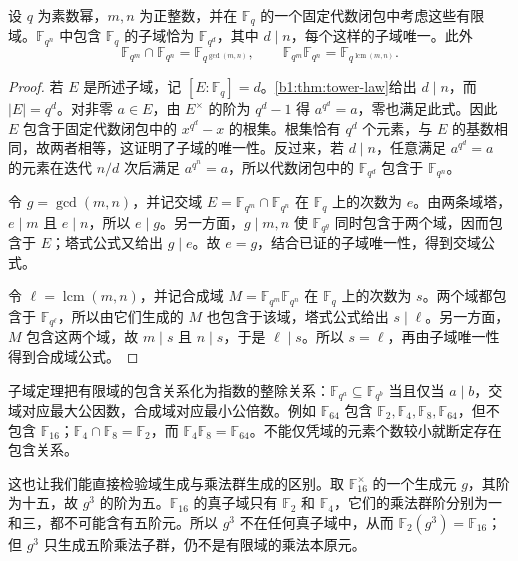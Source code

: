 \begin{theorem}\label{b1:thm:finite-field-subfields}
	设 \(q\) 为素数幂，\(m,n\) 为正整数，并在 \(\mathbb F_q\) 的一个固定代数闭包中考虑这些有限域。\(\mathbb F_{q^n}\) 中包含 \(\mathbb F_q\) 的子域恰为 \(\mathbb F_{q^d}\)，其中 \(d\mid n\)，每个这样的子域唯一。此外
	\[
		\mathbb F_{q^m}\cap\mathbb F_{q^n}=\mathbb F_{q^{\gcd(m,n)}},\qquad \mathbb F_{q^m}\mathbb F_{q^n}=\mathbb F_{q^{\operatorname{lcm}(m,n)}}.
	\]
\end{theorem}
\begin{proof}
	若 \(E\) 是所述子域，记 \([E:\mathbb F_q]=d\)。\cref{b1:thm:tower-law}给出 \(d\mid n\)，而 \(|E|=q^d\)。对非零 \(a\in E\)，由 \(E^\times\) 的阶为 \(q^d-1\) 得 \(a^{q^d}=a\)，零也满足此式。因此 \(E\) 包含于固定代数闭包中的 \(x^{q^d}-x\) 的根集。根集恰有 \(q^d\) 个元素，与 \(E\) 的基数相同，故两者相等，这证明了子域的唯一性。反过来，若 \(d\mid n\)，任意满足 \(a^{q^d}=a\) 的元素在迭代 \(n/d\) 次后满足 \(a^{q^n}=a\)，所以代数闭包中的 \(\mathbb F_{q^d}\) 包含于 \(\mathbb F_{q^n}\)。

	令 \(g=\gcd(m,n)\)，并记交域 \(E=\mathbb F_{q^m}\cap\mathbb F_{q^n}\) 在 \(\mathbb F_q\) 上的次数为 \(e\)。由两条域塔，\(e\mid m\) 且 \(e\mid n\)，所以 \(e\mid g\)。另一方面，\(g\mid m,n\) 使 \(\mathbb F_{q^g}\) 同时包含于两个域，因而包含于 \(E\)；塔式公式又给出 \(g\mid e\)。故 \(e=g\)，结合已证的子域唯一性，得到交域公式。

	令 \(\ell=\operatorname{lcm}(m,n)\)，并记合成域 \(M=\mathbb F_{q^m}\mathbb F_{q^n}\) 在 \(\mathbb F_q\) 上的次数为 \(s\)。两个域都包含于 \(\mathbb F_{q^\ell}\)，所以由它们生成的 \(M\) 也包含于该域，塔式公式给出 \(s\mid\ell\)。另一方面，\(M\) 包含这两个域，故 \(m\mid s\) 且 \(n\mid s\)，于是 \(\ell\mid s\)。所以 \(s=\ell\)，再由子域唯一性得到合成域公式。
\end{proof}
子域定理把有限域的包含关系化为指数的整除关系：\(\mathbb F_{q^a}\subseteq\mathbb F_{q^b}\) 当且仅当 \(a\mid b\)，交域对应最大公因数，合成域对应最小公倍数。例如 \(\mathbb F_{64}\) 包含 \(\mathbb F_2,\mathbb F_4,\mathbb F_8,\mathbb F_{64}\)，但不包含 \(\mathbb F_{16}\)；\(\mathbb F_4\cap\mathbb F_8=\mathbb F_2\)，而 \(\mathbb F_4\mathbb F_8=\mathbb F_{64}\)。不能仅凭域的元素个数较小就断定存在包含关系。

\ProseParagraphBreak
这也让我们能直接检验域生成与乘法群生成的区别。取 \(\mathbb F_{16}^\times\) 的一个生成元 \(g\)，其阶为十五，故 \(g^3\) 的阶为五。\(\mathbb F_{16}\) 的真子域只有 \(\mathbb F_2\) 和 \(\mathbb F_4\)，它们的乘法群阶分别为一和三，都不可能含有五阶元。所以 \(g^3\) 不在任何真子域中，从而 \(\mathbb F_2(g^3)=\mathbb F_{16}\)；但 \(g^3\) 只生成五阶乘法子群，仍不是有限域的乘法本原元。

